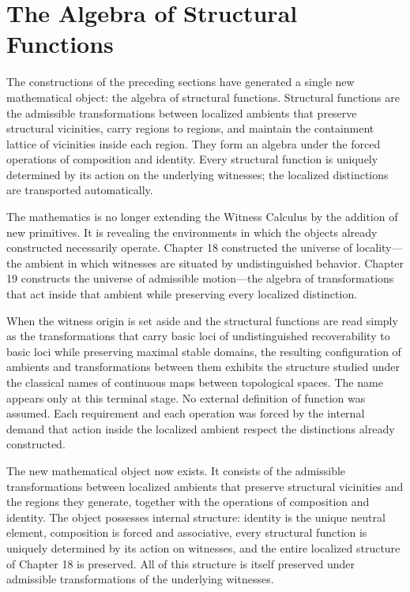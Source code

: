 \documentclass[12pt,anyside]{book}
\begin{document}
\section{The Algebra of Structural Functions}
The constructions of the preceding sections have generated a single new mathematical object: the algebra of structural functions. Structural functions are the admissible transformations between localized ambients that preserve structural vicinities, carry regions to regions, and maintain the containment lattice of vicinities inside each region. They form an algebra under the forced operations of composition and identity. Every structural function is uniquely determined by its action on the underlying witnesses; the localized distinctions are transported automatically.

The mathematics is no longer extending the Witness Calculus by the addition of new primitives. It is revealing the environments in which the objects already constructed necessarily operate. Chapter 18 constructed the universe of locality---the ambient in which witnesses are situated by undistinguished behavior. Chapter 19 constructs the universe of admissible motion---the algebra of transformations that act inside that ambient while preserving every localized distinction. 

When the witness origin is set aside and the structural functions are read simply as the transformations that carry basic loci of undistinguished recoverability to basic loci while preserving maximal stable domains, the resulting configuration of ambients and transformations between them exhibits the structure studied under the classical names of continuous maps between topological spaces. The name appears only at this terminal stage. No external definition of function was assumed. Each requirement and each operation was forced by the internal demand that action inside the localized ambient respect the distinctions already constructed.

The new mathematical object now exists. It consists of the admissible transformations between localized ambients that preserve structural vicinities and the regions they generate, together with the operations of composition and identity. The object possesses internal structure: identity is the unique neutral element, composition is forced and associative, every structural function is uniquely determined by its action on witnesses, and the entire localized structure of Chapter 18 is preserved. All of this structure is itself preserved under admissible transformations of the underlying witnesses.
\end{document}
